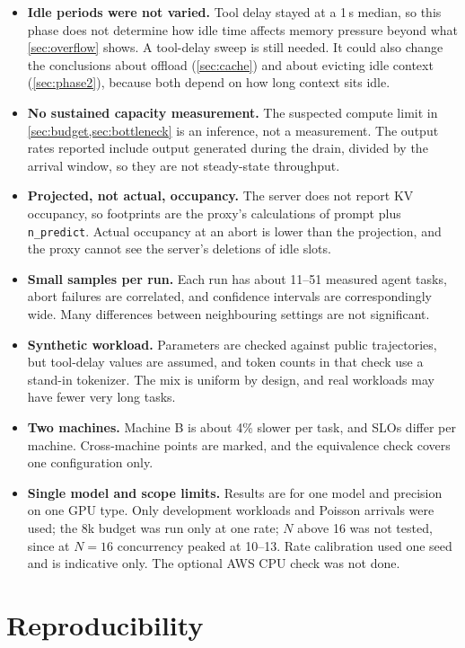\begin{itemize}
  \item \textbf{Idle periods were not varied.} Tool delay stayed at a 1\,s median, so this phase does not determine how idle time affects memory pressure beyond what \cref{sec:overflow} shows. A tool-delay sweep is still needed. It could also change the conclusions about offload (\cref{sec:cache}) and about evicting idle context (\cref{sec:phase2}), because both depend on how long context sits idle.
  \item \textbf{No sustained capacity measurement.} The suspected compute limit in \cref{sec:budget,sec:bottleneck} is an inference, not a measurement. The output rates reported include output generated during the drain, divided by the arrival window, so they are not steady-state throughput.
  \item \textbf{Projected, not actual, occupancy.} The server does not report KV occupancy, so footprints are the proxy's calculations of prompt plus \texttt{n\_predict}. Actual occupancy at an abort is lower than the projection, and the proxy cannot see the server's deletions of idle slots.
  \item \textbf{Small samples per run.} Each run has about 11--51 measured agent tasks, abort failures are correlated, and confidence intervals are correspondingly wide. Many differences between neighbouring settings are not significant.
  \item \textbf{Synthetic workload.} Parameters are checked against public trajectories, but tool-delay values are assumed, and token counts in that check use a stand-in tokenizer. The mix is uniform by design, and real workloads may have fewer very long tasks.
  \item \textbf{Two machines.} Machine B is about 4\% slower per task, and SLOs differ per machine. Cross-machine points are marked, and the equivalence check covers one configuration only.
  \item \textbf{Single model and scope limits.} Results are for one model and precision on one GPU type. Only development workloads and Poisson arrivals were used; the 8k budget was run only at one rate; $N$ above 16 was not tested, since at $N=16$ concurrency peaked at 10--13. Rate calibration used one seed and is indicative only. The optional AWS CPU check was not done.
\end{itemize}

\section{Reproducibility}\label{sec:repro}

